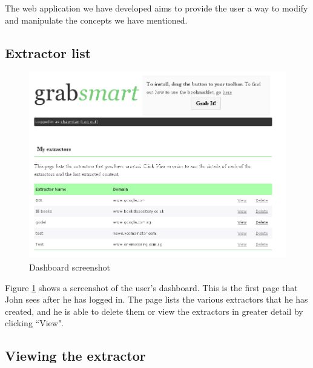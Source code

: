 The web application we have developed aims to provide the user a way to modify and
 manipulate the concepts we have mentioned.

 \subsection{Extractor list}
\begin{figure}[htbp]
\centering
\includegraphics[scale=0.43]{dashboard.png} 
\caption{Dashboard screenshot}
\label{fig:dashboard}
\end{figure}

 
 Figure \ref{fig:dashboard}
 shows a screenshot of the user's dashboard. This is the first page that John sees
 after he has logged in. The page lists the various extractors that he has created, and 
 he is able to delete them or view the extractors in greater detail by clicking ``View".
 
 \subsection{Viewing the extractor}

